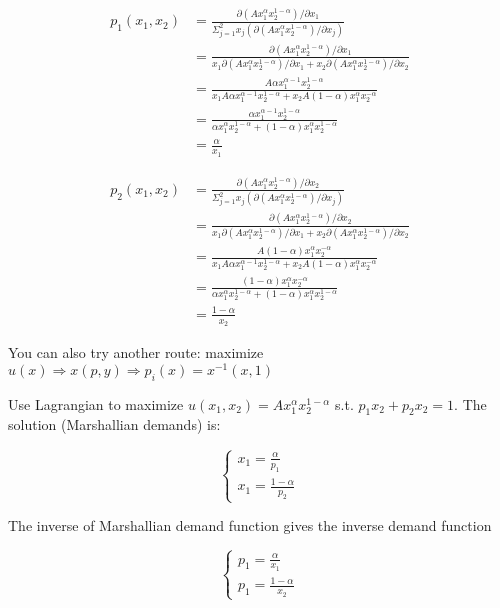 \documentclass{article}
\begin{document}
\begin{align*}
p_1(x_1,x_2) &=  \frac{\partial (Ax_1^{\alpha}x_2^{1-\alpha}) / \partial x_1}{\Sigma^{2}_{j=1} x_j( \partial (Ax_1^{\alpha}x_2^{1-\alpha}) / \partial x_j)} \\
&=\frac{\partial (Ax_1^{\alpha}x_2^{1-\alpha}) / \partial x_1}{x_1 \partial (Ax_1^{\alpha}x_2^{1-\alpha}) / \partial x_1 + x_2  \partial (Ax_1^{\alpha}x_2^{1-\alpha}) / \partial x_2} \\
&=\frac{A\alpha x_1^{\alpha -1}x_2^{1-\alpha}}{x_1 A\alpha x_1^{\alpha -1}x_2^{1-\alpha} + x_2A(1-\alpha) x_1^{\alpha}x_2^{-\alpha}} \\
&=\frac{\alpha x_1^{\alpha -1}x_2^{1-\alpha}}{\alpha x_1^{\alpha}x_2^{1-\alpha} + (1-\alpha) x_1^{\alpha}x_2^{1-\alpha}} \\
&=\frac{\alpha}{x_1}
\end{align*}

\begin{align*}
p_2(x_1,x_2) &=  \frac{\partial (Ax_1^{\alpha}x_2^{1-\alpha}) / \partial x_2}{\Sigma^{2}_{j=1} x_j( \partial (Ax_1^{\alpha}x_2^{1-\alpha}) / \partial x_j)} \\
&=\frac{\partial (Ax_1^{\alpha}x_2^{1-\alpha}) / \partial x_2}{x_1 \partial (Ax_1^{\alpha}x_2^{1-\alpha}) / \partial x_1 + x_2  \partial (Ax_1^{\alpha}x_2^{1-\alpha}) / \partial x_2} \\
&=\frac{A(1-\alpha) x_1^{\alpha}x_2^{-\alpha}}{x_1 A\alpha x_1^{\alpha -1}x_2^{1-\alpha} + x_2A(1-\alpha) x_1^{\alpha}x_2^{-\alpha}} \\
&=\frac{(1-\alpha) x_1^{\alpha}x_2^{-\alpha}}{\alpha x_1^{\alpha}x_2^{1-\alpha} + (1-\alpha) x_1^{\alpha}x_2^{1-\alpha}} \\
&=\frac{1-\alpha}{x_2}
\end{align*}

\begin{mdframed}[backgroundcolor=blue!20,linecolor=white]
You can also try another route: maximize $u(x) \Rightarrow x(p,y) \Rightarrow p_i(x) = x^{-1}(x,1)$

Use Lagrangian to maximize $u(x_1, x_2) = Ax_1^{\alpha}x_2^{1-\alpha}$
s.t. $p_1x_2 + p_2x_2 = 1$. The solution (Marshallian demands) is:

\begin{equation}
    \begin{cases}
x_1 = \frac{\alpha}{p_1} \\
x_1 = \frac{1-\alpha}{p_2}
    \end{cases}
\nonumber
\end{equation}

The inverse of Marshallian demand function gives the inverse demand function

\begin{equation}
    \begin{cases}
p_1 = \frac{\alpha}{x_1} \\
p_1 = \frac{1-\alpha}{x_2}
    \end{cases}
\nonumber
\end{equation}


\end{mdframed}
\end{document}
